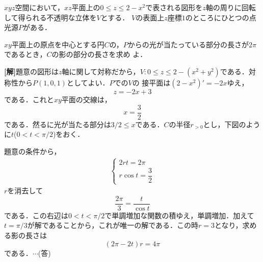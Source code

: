 \documentclass[a4j]{jarticle}
\begin{document}

     \begin{oframed}
     $xyz$空間において，$xz$平面上の$0\le z\le 2-x^2$で表される図形を$z$軸の周りに回転して得られる不透明な立体を$V$とする．
     $V$の表面上$z$座標$1$のところにひとつの点光源$P$がある．
     
     $xy$平面上の原点を中心とする円$C$の，$P$からの光が当たっている部分の長さが$2\pi$であるとき，$C$の影の部分の長さを求め
     よ．
     \end{oframed}

\setlength{\columnseprule}{0.4pt}
\begin{multicols}{2}
{\bf[解]}題意の図形は$z$軸に関して対称だから，$V:0\le z\le 2-(x^2+y^2)$である．対称性から$P(1,0,1)$としてよい．$P$での$V$の
接平面は$(2-x^2)'=-2x$ゆえ，
     \[z=-2x+3\]
である．これと$xy$平面の交線は，
     \[x=\frac{3}{2}\]
である．然るに光が当たる部分は$3/2\le x$である．$C$の半径$r_{>0}$とし，下図のように$t$($0<t<\pi/2$)をおく．
     \begin{center}
     \scalebox{0.7}{}
     \end{center}
題意の条件から，
     \begin{align}
          \begin{cases}
          2rt=2\pi \\ 
          r\cos t=\dfrac{3}{2}
          \end{cases}
     \end{align}
$r$を消去して
     \[\frac{2\pi}{3}=\frac{t}{\cos t}\]
である．この右辺は$0<t<\pi/2$で単調増加な関数の積ゆえ，単調増加．加えて$t=\pi/3$が解であることから，これが唯一の解である．この時$r=3$となり，求める影の長さは
     \[(2\pi-2t)r=4\pi\]
である．$\cdots$(答)     
  
     
\newpage
\end{multicols}
\end{document}
